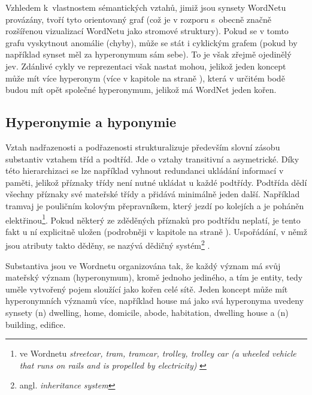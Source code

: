 \documentclass[a4paper, 11pt, oneside, showtrims]{book}
\newcommand{\itNameRef}[1]{\textit{\nameref{#1}}}
\newcommand\ex{\textsf}
\begin{document}
				Vzhledem k~vlastnostem sémantických vztahů, jimiž jsou synsety WordNetu provázány, tvoří tyto orientovaný graf (což je v rozporu s~obecně značně rozšířenou vizualizací WordNetu jako stromové struktury). Pokud se v tomto grafu vyskytnout anomálie (chyby), může se stát i cyklickým grafem (pokud by například synset měl za hyperonymum sám sebe). To je však zřejmě ojedinělý jev. \parencite{richens2008anomalies} Zdánlivé cykly ve reprezentaci však nastat mohou, jelikož jeden koncept může mít více hyperonym (více v kapitole \itNameRef{cha:hyperohyp} na straně \pageref{cha:hyperohyp}), která v určitém bodě budou mít opět společné hyperonymum, jelikož má WordNet jeden kořen.


				
				\subsection{Hyperonymie a hyponymie}
				\label{cha:hyperohyp}

					Vztah nadřazenosti a podřazenosti strukturalizuje především slovní zásobu substantiv vztahem tříd a podtříd. Jde o vztahy transitivní a asymetrické. \parencite{miller1990introduction} Díky této hierarchizaci se lze například vyhnout redundanci ukládání informací v paměti, jelikož příznaky třídy není nutné ukládat u každé podtřídy. Podtřída dědí všechny příznaky své mateřské třídy a přidává minimálně jeden další. Například \ex{tramvaj} je \ex{pouličním kolovým přepravníkem, který jezdí po kolejích a je poháněn elektřinou}\footnote{ve Wordnetu \textit{streetcar, tram, tramcar, trolley, trolley car (a wheeled vehicle that runs on rails and is propelled by electricity)} \parencite{princetonWN}}. Pokud některý ze zděděných příznaků pro podtřídu neplatí, je tento fakt u ní explicitně uložen (podrobněji v kapitole \itNameRef{cha:psycho} na straně \pageref{cha:psycho}). Uspořádání, v němž jsou atributy takto děděny, se nazývá dědičný systém\footnote{angl. \textit{inheritance system}} \parencite{touretzky1986mathematics}.

					Substantiva jsou ve Wordnetu organizována tak, že každý význam má svůj mateřský význam (hyperonymum), kromě jednoho jediného, a tím je \ex{entity}, tedy uměle vytvořený pojem sloužící jako kořen celé sítě. Jeden koncept může mít hyperonymních významů více, například \ex{house} má jako svá hyperonyma uvedeny synsety \ex{(n) dwelling, home, domicile, abode, habitation, dwelling house} a \ex{(n) building, edifice}.
\end{document}
